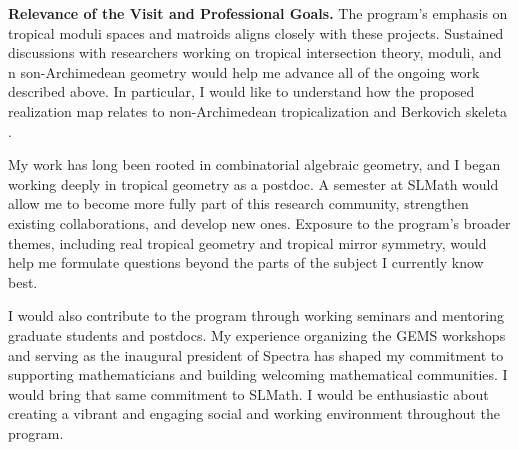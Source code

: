 \documentclass[11pt,reqno]{amsart}
\begin{document}
\textbf{Relevance of the Visit and Professional Goals.}
The program's emphasis on tropical moduli spaces and matroids aligns closely with these projects. Sustained discussions with researchers working on tropical intersection theory, moduli, and n son-Archimedean geometry would help me advance all of the ongoing work described above. In particular, I would like to understand how the proposed realization map relates to non-Archimedean tropicalization and Berkovich skeleta \cite{Viv13,ACP15}.

My work has long been rooted in combinatorial algebraic geometry, and I began working deeply in tropical geometry as a postdoc. A semester at SLMath would allow me to become more fully part of this research community, strengthen existing collaborations, and develop new ones. Exposure to the program's broader themes, including real tropical geometry and tropical mirror symmetry, would help me formulate questions beyond the parts of the subject I currently know best.

I would also contribute to the program through working seminars and mentoring graduate students and postdocs. My experience organizing the GEMS workshops and serving as the inaugural president of Spectra has shaped my commitment to supporting mathematicians and building welcoming mathematical communities. I would bring that same commitment to SLMath. I would be enthusiastic about creating a vibrant and engaging social and working environment throughout the program. 
\end{document}
